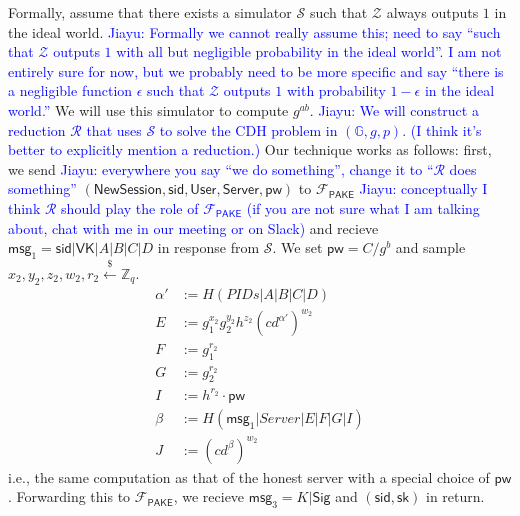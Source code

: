 \documentclass[12pt,a4paper]{article}
\newcommand{\simulator}{\mathcal{S}}
\newcommand{\env}{\mathcal{Z}}
\newcommand{\pake}{\mathcal{F}_{\mathsf{PAKE}}}
\newcommand{\user}{\mathsf{User}}
\newcommand{\sk}{\mathsf{sk}}
\newcommand{\pw}{\mathsf{pw}}
\newcommand{\newsession}{\mathsf{NewSession}}
\newcommand{\server}{\mathsf{Server}}
\newcommand{\msg}[1]{\mathsf{msg}_{#1}}
\def\xjy#1{\textcolor{blue}{Jiayu: #1}}
\begin{document}
	Formally, assume that there exists a simulator $\simulator$ such that $\env$ always outputs $1$ in the ideal world. \xjy{Formally we cannot really assume this; need to say ``such that $\env$ outputs $1$ with all but negligible probability in the ideal world''. I am not entirely sure for now, but we probably need to be more specific and say ``there is a negligible function $\epsilon$ such that $\env$ outputs $1$ with probability $1-\epsilon$ in the ideal world.''} We will use this simulator to compute $g^{ab}$. \xjy{We will construct a reduction $\mathcal{R}$ that uses $\simulator$ to solve the CDH problem in $(\mathbb{G},g,p)$. (I think it's better to explicitly mention a reduction.)} Our technique works as follows: first, we send \xjy{everywhere you say ``we do something'', change it to ``$\mathcal{R}$ does something''} $(\newsession,\mathsf{sid},\user,\server,\pw)$ to $\pake$ \xjy{conceptually I think $\mathcal{R}$ should play the role of $\pake$ (if you are not sure what I am talking about, chat with me in our meeting or on Slack)} and recieve $\msg{1} = \mathsf{sid}|\mathsf{VK}|A|B|C|D$ in response from $\simulator$. We set $\pw = C/g^b$ and sample $x_2,y_2,z_2,w_2,r_2\xleftarrow{\$}\mathbb{Z}_q$. 
	\begin{align*}
		\alpha'&:=H(PIDs|A|B|C|D)\\
		E &:= g_1^{x_2}g_2^{y_2}h^{z_2}(cd^{\alpha'})^{w_2}\\
		F &:= g_1^{r_2}\\
		G &:= g_2^{r_2}\\
		I &:= h^{r_2}\cdot\pw\\
		\beta &:= H(\msg{1}|Server|E|F|G|I)\\
		J &:= (cd^{\beta})^{w_2}
	\end{align*}
	i.e., the same computation as that of the honest server with a special choice of $\pw$. Forwarding this to $\pake$, we recieve $\msg{3}=K|\mathsf{Sig}$ and $(\mathsf{sid}, \sk)$ in return.

	
	
	
	\pagebreak
	\appendix
	
%	
%	
	
\end{document}
